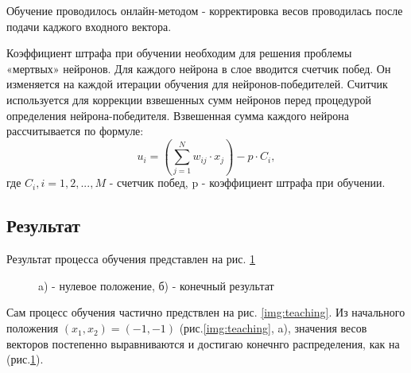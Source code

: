 Обучение проводилось онлайн-методом - корректировка весов проводилась после подачи каджого входного вектора.

Коэффициент штрафа при обучении необходим для решения проблемы «мертвых» нейронов. Для каждого нейрона в слое вводится счетчик побед. Он изменяется на каждой итерации обучения для нейронов-победителей. Считчик используется для коррекции взвешенных сумм нейронов перед процедурой определения нейрона-победителя. Взвешенная сумма каждого нейрона рассчитывается по формуле:
\begin{equation}\label{eq:penaltyFunc}
    u _ { i } = \left( \sum _ { j = 1 } ^ { N } w _ { i j } \cdot x _ { j } \right) - p \cdot C_i,
\end{equation}
где $C_i, i=1, 2, ..., M$ - счетчик побед, p - коэффициент штрафа при обучении.

\subsection{Результат}

Результат процесса обучения представлен на рис. \ref{img:result}

\begin{figure}[h]
    \begin{minipage}[h]{0.49\linewidth}
    \end{minipage}
    \hfill
    \begin{minipage}[h]{0.49\linewidth}
    \end{minipage}
    \caption{a) - нулевое положение, б) - конечный результат}
    \label{img:result}
\end{figure}

Сам процесс обучения частично предствлен на рис. \ref{img:teaching}. Из начального положения $(x_1, x_2) = (-1, -1)$ (рис.\ref{img:teaching}, a), значения весов векторов  постепенно выравниваются и достигаю конечнго распределения, как на (рис.\ref{img:result}).

